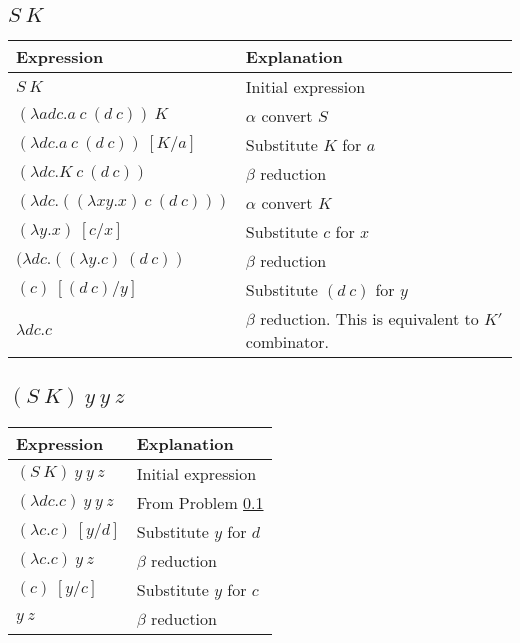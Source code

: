 \documentclass[letterpaper, 10pt, DIV=13]{scrartcl}
\numberwithin{equation}{section}
\numberwithin{figure}{section}
\numberwithin{table}{section}
\begin{document}
\subsection{$S~K$}\label{part-e}
\begin{center}
\begin{tabularx}{\textwidth}{|Y|Y|}
    \hline
    Expression & Explanation \\
    \hline
    $S~K$ & Initial expression \\
    \hline
    $(\lambda adc.a~c~(d~c))~K$ & $\alpha$ convert $S$ \\
    \hline
    $(\lambda dc.a~c~(d~c))~[K / a]$ & Substitute $K$ for $a$ \\
    \hline
    $(\lambda dc.K~c~(d~c))$ & $\beta$ reduction \\
    \hline
    $(\lambda dc.((\lambda xy.x)~c~(d~c)))$ & $\alpha$ convert $K$ \\
    \hline
    $(\lambda y.x)~[c / x]$ & Substitute $c$ for $x$ \\
    \hline
    $(\lambda dc.((\lambda y.c)~(d~c))$ & $\beta$ reduction \\
    \hline
    $(c)~[(d~c) / y]$ & Substitute $(d~c)$ for $y$ \\
    \hline
    $\lambda dc.c$ & $\beta$ reduction. This is equivalent to $K'$ combinator. \\
    \hline
\end{tabularx}
\end{center}

\subsection{$(S~K)~y~y~z$}
\begin{center}
\begin{tabularx}{\textwidth}{|Y|Y|}
    \hline
    Expression & Explanation \\
    \hline
    $(S~K)~y~y~z$ & Initial expression \\
    \hline
    $(\lambda dc.c)~y~y~z$ & From Problem \ref{part-e} \\
    \hline
    $(\lambda c.c)~[y / d]$ & Substitute $y$ for $d$ \\
    \hline
    $(\lambda c.c)~y~z$ & $\beta$ reduction \\
    \hline
    $(c)~[y / c]$ & Substitute $y$ for $c$ \\
    \hline
    $y~z$ & $\beta$ reduction \\
    \hline
\end{tabularx}
\end{center}
\end{document}

